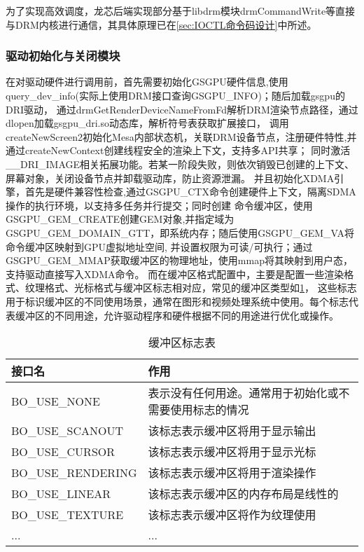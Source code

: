 为了实现高效调度，龙芯后端实现部分基于libdrm模块drmCommandWrite等直接与DRM内核进行通信，其具体原理已在\ref{sec:IOCTL命令码设计}中所述。

\subsubsection{驱动初始化与关闭模块}

在对驱动硬件进行调用前，首先需要初始化GSGPU硬件信息,使用query\_dev\_info(实际上使用DRM接口查询GSGPU\_INFO)；随后加载gsgpu的DRI驱动，
通过drmGetRenderDeviceNameFromFd解析DRM渲染节点路径，通过dlopen加载gsgpu\_dri.so动态库，解析符号表获取扩展接口，
调用createNewScreen2初始化Mesa内部状态机，关联DRM设备节点，注册硬件特性,并通过createNewContext创建线程安全的渲染上下文，支持多API共享；
同时激活\_\_DRI\_IMAGE相关拓展功能。若某一阶段失败，则依次销毁已创建的上下文、屏幕对象，关闭设备节点并卸载驱动库，防止资源泄漏。
并且初始化XDMA引擎，首先是硬件兼容性检查,通过GSGPU\_CTX命令创建硬件上下文，隔离SDMA操作的执行环境，以支持多任务并行提交；同时创建
命令缓冲区，使用GSGPU\_GEM\_CREATE创建GEM对象,并指定域为GSGPU\_GEM\_DOMAIN\_GTT，即系统内存；随后使用GSGPU\_GEM\_VA将命令缓冲区映射到GPU虚拟地址空间,
并设置权限为可读/可执行；通过GSGPU\_GEM\_MMAP获取缓冲区的物理地址，使用mmap将其映射到用户态，支持驱动直接写入XDMA命令。
而在缓冲区格式配置中，主要是配置一些渲染格式、纹理格式、光标格式与缓冲区标志相对应，常见的缓冲区类型如\ref{tab:缓冲区标志表}，
这些标志用于标识缓冲区的不同使用场景，通常在图形和视频处理系统中使用。每个标志代表缓冲区的不同用途，允许驱动程序和硬件根据不同的用途进行优化或操作。

\begin{table}[h]  
  \centering
  \caption{缓冲区标志表}
  \label{tab:缓冲区标志表}
  \begin{tabular}{ll}
    \toprule
    接口名  & 作用\\
    \midrule
    BO\_USE\_NONE & 表示没有任何用途。通常用于初始化或不需要使用标志的情况 \\
    BO\_USE\_SCANOUT & 该标志表示缓冲区将用于显示输出 \\
    BO\_USE\_CURSOR & 该标志表示缓冲区将用于显示光标 \\
    BO\_USE\_RENDERING & 该标志表示缓冲区将用于渲染操作 \\
    BO\_USE\_LINEAR & 该标志表示缓冲区的内存布局是线性的 \\
    BO\_USE\_TEXTURE & 该标志表示缓冲区将作为纹理使用 \\
    ... & ... \\
    \bottomrule
  \end{tabular}
  \note{}
\end{table}

